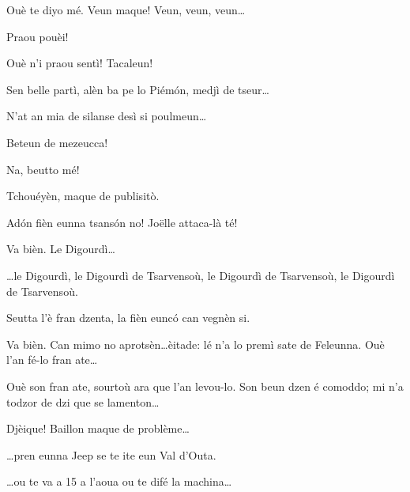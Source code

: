 \begin{drama}
\Jordyspeaks Ouè te diyo mé. Veun maque! Veun, veun, veun\ldots


\Jordyspeaks Praou pouèi!

\Chauffeurspeaks Ouè n'i praou sentì! Tacaleun!


\Joelspeaks Sen belle partì, alèn ba pe lo Piém\'on, medjì de tseur\ldots 


\Joelspeaks N'at an mia de silanse desì si poulmeun\ldots

\Thierryspeaks Beteun de mezeucca!


\Chauffeur Na, beutto mé!


\Chauffeurspeaks Tchouéyèn, maque de publisitò.

\Joelspeaks Ad\'on fièn eunna tsans\'on no! Jo\"{e}lle attaca-là té!

\Joellespeaks Va bièn.  Le Digourdì\ldots

\Tcheuttespeaks{} \ldots le Digourdì, le Digourdì de Tsarvensoù, le Digourdì de Tsarvensoù, le Digourdì de Tsarvensoù.

\Joelspeaks Seutta l'è fran dzenta, la fièn euncó can vegnèn si.

\Chauffeurspeaks Va bièn. Can mimo no aprotsèn\ldots èitade: lé n'a lo premì sate de Feleunna. Ouè l'an fé-lo fran ate\ldots


\Joelspeaks Ouè son fran ate, sourtoù ara que l'an levou-lo. Son beun dzen é comoddo; mi n'a todzor de dzi que se lamenton\ldots

\Chauffeurspeaks Djèique! Baillon maque de problème\ldots

\Joelspeaks{} \ldots pren eunna Jeep se te ite eun Val d'Outa.

\Chauffeurspeaks{} \ldots ou te va a 15 a l'aoua ou te difé la machina\ldots


\end{drama}
